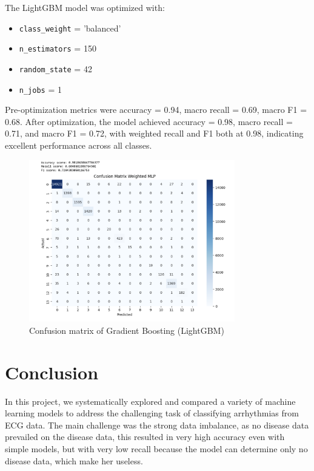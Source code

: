 \documentclass[a4paper,12pt]{article}
\begin{document}
The LightGBM model was optimized with:
\begin{itemize}
    \item \texttt{class\_weight} = 'balanced'
    \item \texttt{n\_estimators} = 150
    \item \texttt{random\_state} = 42
    \item \texttt{n\_jobs} = 1
\end{itemize}
Pre-optimization metrics were accuracy = 0.94, macro recall = 0.69, macro F1 = 0.68. After optimization, the model achieved accuracy = 0.98, macro recall = 0.71, and macro F1 = 0.72, with weighted recall and F1 both at 0.98, indicating excellent performance across all classes.

\begin{figure}[H]
    \centering
    \includegraphics[width=0.8\textwidth]{Figs/Gradient_boosting.png}
    \caption{Confusion matrix of Gradient Boosting (LightGBM)}
    \label{fig:conf_mat_lgbm}
\end{figure}
\section*{Conclusion}

In this project, we systematically explored and compared a variety of machine learning models to address the challenging task of classifying arrhythmias from ECG data. The main challenge was the strong data imbalance, as no disease data prevailed on the disease data, this resulted in very high accuracy even with simple models, but with very low recall because the model can determine only no disease data, which make her useless.
\end{document}
